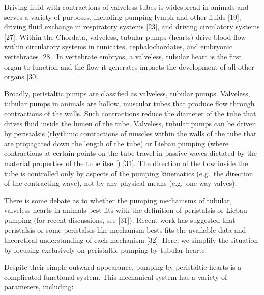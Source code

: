 \documentclass[
]{article}
\begin{document}
Driving fluid with contractions of valveless tubes is widespread in
animals and serves a variety of purposes, including pumping lymph and
other fluids {[}19{]}, driving fluid exchange in respiratory systems
{[}23{]}, and driving circulatory systems {[}27{]}. Within the Chordata,
valveless, tubular pumps (hearts) drive blood flow within circulatory
systems in tunicates, cephalochordates, and embryonic vertebrates
{[}28{]}. In vertebrate embryos, a valveless, tubular heart is the first
organ to function and the flow it generates impacts the development of
all other organs {[}30{]}.

Broadly, peristaltic pumps are classified as valveless, tubular pumps.
Valveless, tubular pumps in animals are hollow, muscular tubes that
produce flow through contractions of the walls. Such contractions reduce
the diameter of the tube that drives fluid inside the lumen of the tube.
Valveless, tubular pumps can be driven by peristalsis (rhythmic
contractions of muscles within the walls of the tube that are propagated
down the length of the tube) or Liebau pumping (where contractions at
certain points on the tube travel in passive waves dictated by the
material properties of the tube itself) {[}31{]}. The direction of the
flow inside the tube is controlled only by aspects of the pumping
kinematics (e.g.~the direction of the contracting wave), not by any
physical means (e.g.~one-way valves).

There is some debate as to whether the pumping mechanisms of tubular,
valveless hearts in animals best fits with the definition of peristalsis
or Liebau pumping (for recent discussions, see {[}31{]}). Recent work
has suggested that peristalsis or some peristalsis-like mechanism bests
fits the available data and theoretical understanding of each mechanism
{[}32{]}. Here, we simplify the situation by focusing exclusively on
peristaltic pumping by tubular hearts.

Despite their simple outward appearance, pumping by peristaltic hearts
is a complicated functional system. This mechanical system has a variety
of parameters, including:
\end{document}
